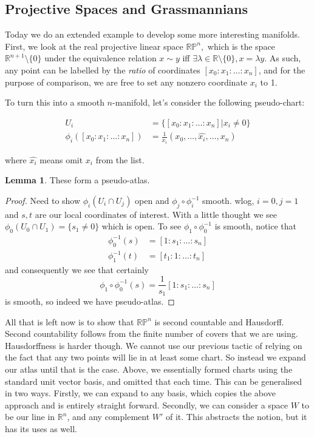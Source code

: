 \documentclass{article}
\theoremstyle{definition}
\newtheorem{lemma}{Lemma}
\begin{document}
\subsection{Projective Spaces and Grassmannians}

Today we do an extended example to develop some more interesting manifolds.
First, we look at the real projective linear space $\mathbb{RP}^n,$ which is the
space $\mathbb{R}^{n + 1} \setminus \{0\}$ under the equivalence relation $x \sim y$ iff
$\exists \lambda \in \mathbb{R} \setminus \{0\}, x = \lambda y$. As such, any
point can be labelled by the \textit{ratio} of coordinates $[x_0 : x_1 : \dots :
x_n]$, and for the purpose of comparison, we are free to set any nonzero
coordinate $x_i$ to 1.

To turn this into a smooth $n$-manifold, let's consider the following
pseudo-chart:

\begin{align*}
  U_i &= \{[x_0 : x_1 : \dots : x_n] | x_i \neq 0\} \\
  \phi_i([x_0 : x_1 : \dots : x_n]) &= \frac{1}{x_i} (x_0, \dots, \hat{x_i}, \dots, x_n)
\end{align*}

where $\hat{x_i}$ means omit $x_i$ from the list. 

\begin{lemma}
  These form a pseudo-atlas.
\end{lemma}
\begin{proof}
  Need to show $\phi_i(U_i \cap U_j)$ open and $\phi_j \circ \phi_i^{-1}$
  smooth. wlog, $i=0, j=1$ and $s, t$ are our local coordinates of interest.
  With a little thought we see $\phi_0(U_0 \cap U_1) = \{s_1 \neq 0\}$ which is
  open. To see $\phi_1 \circ \phi_0^{-1}$ is smooth, notice that
  \begin{align*}
    \phi_0^{-1}(s) &= [1 : s_1 : \dots : s_n] \\
    \phi_1^{-1}(t) &= [t_1 : 1 : \dots : t_n]
  \end{align*}
  and consequently we see that certainly
  $$ \phi_1 \circ \phi_0^{-1}(s) = \frac{1}{s_1}[1 : s_1 : \dots : s_n] $$
  is smooth, so indeed we have pseudo-atlas.
\end{proof}

All that is left now is to show that $\mathbb{RP}^n$ is second countable and
Hausdorff. Second countability follows from the finite number of covers that we
are using. Hausdorffness is harder though. We cannot use our previous tactic of
relying on the fact that any two points will lie in at least some chart. So
instead we expand our atlas until that is the case. Above, we essentially formed
charts using the standard unit vector basis, and omitted that each time. This
can be generalised in two ways. Firstly, we can expand to any basis, which
copies the above approach and is entirely straight forward. Secondly, we can
consider a space $W$ to be our line in $\mathbb{R}^n$, and any complement $W'$
of it. This abstracts the notion, but it has its uses as well.
\end{document}
